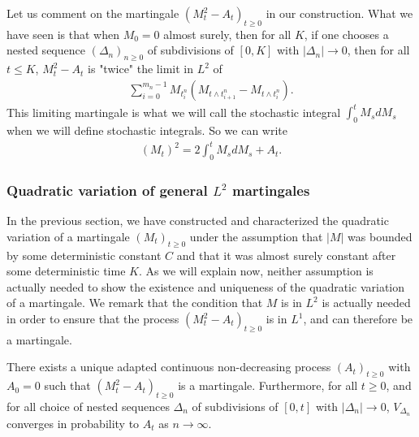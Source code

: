 \documentclass[../mainfile.tex]{subfiles}
\begin{document}
\begin{rem} Let us comment on the martingale $(M_t^2-A_t)_{t \geq 0}$ in our construction. What we have seen is that when $M_0=0$ almost surely, then for all $K$, if one chooses a nested sequence $(\Delta_n)_{n \geq 0}$ of subdivisions of $[0,K]$ with $|\Delta_n| \to 0$, then for all $t \leq K$, $M_t^2-A_t$ is "twice" the limit in $L^2$ of 
\begin{align*}
\sum_{i=0}^{m_n-1} M_{t_i^n} (M_{t \wedge t_{i+1}^n}- M_{t \wedge t_i^n}).
\end{align*}
This limiting martingale is what we will call the stochastic integral $\int_0^t M_sdM_s$ when we will define stochastic integrals. So we can write
\begin{align*}
(M_t)^2 = 2 \int_0^t M_sdM_s + A_t. 
\end{align*}
\end{rem}
\newpage
\subsubsection{Quadratic variation of general $L^2$ martingales}
In the previous section, we have constructed and characterized the quadratic variation of a martingale $(M_t)_{t \geq 0}$ under the assumption that $|M|$ was bounded by some deterministic constant $C$ and that it was almost surely constant after some deterministic time $K$. As we will explain now, neither assumption is actually needed to show the existence and uniqueness of the quadratic variation of a martingale. We remark that the condition that $M$ is in $L^2$ is actually needed in order to ensure that the process $(M_t^2-A_t)_{t \geq 0}$ is in $L^1$, and can therefore be a martingale. 

\begin{thm} There exists a unique adapted continuous non-decreasing process $(A_t)_{t \geq 0}$ with $A_0=0$ such that $(M_t^2-A_t)_{t \geq 0}$ is a martingale. Furthermore, for all $ t \geq 0$, and for all choice of nested sequences $\Delta_n$ of subdivisions of $[0,t]$ with $|\Delta_n| \to 0 $, $V_{\Delta_n}$ converges in probability to $A_t$ as $n \to \infty$. 
\end{thm}
\end{document}
